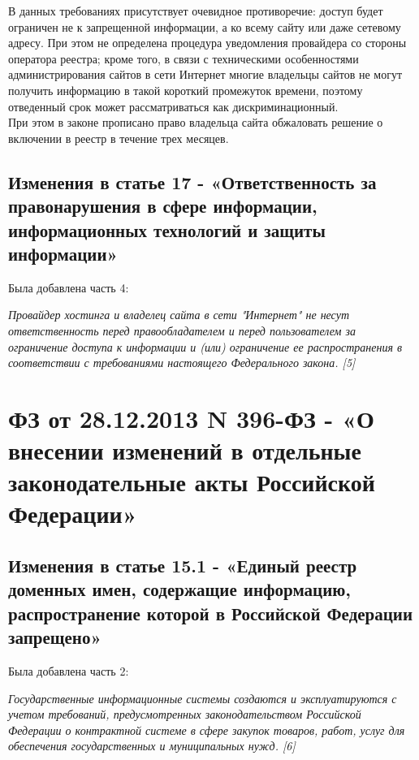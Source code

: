 \documentclass[14pt,a4paper,report]{article}
\begin{document}
В данных требованиях присутствует очевидное противоречие: доступ будет ограничен не к запрещенной информации, а ко всему сайту или даже сетевому адресу. При этом не определена процедура уведомления провайдера со стороны оператора реестра; кроме того, в связи с техническими особенностями администрирования сайтов в сети Интернет многие владельцы сайтов не могут получить информацию в такой короткий промежуток времени, поэтому отведенный срок может рассматриваться как дискриминационный.\\

При этом в законе прописано право владельца сайта обжаловать решение о включении в реестр в течение трех месяцев.


\subsection{Изменения в статье 17 - «Ответственность за правонарушения в сфере информации, информационных технологий и защиты информации»}

Была добавлена часть 4:

\begin{displayquote}
	\emph{Провайдер хостинга и владелец сайта в сети "Интернет" не несут ответственность перед правообладателем и перед пользователем за ограничение доступа к информации и (или) ограничение ее распространения в соответствии с требованиями настоящего Федерального закона. [5]}
\end{displayquote}


\section{ФЗ от 28.12.2013 N 396-ФЗ - «О внесении изменений в отдельные законодательные акты Российской Федерации»}

\subsection{Изменения в статье 15.1 - «Единый реестр доменных имен, содержащие информацию, распространение которой в Российской Федерации запрещено»}

Была добавлена часть 2:

\begin{displayquote}
	\emph{Государственные информационные системы создаются и эксплуатируются с учетом требований, предусмотренных законодательством Российской Федерации о контрактной системе в сфере закупок товаров, работ, услуг для обеспечения государственных и муниципальных нужд. [6]}
\end{displayquote}
\end{document}
